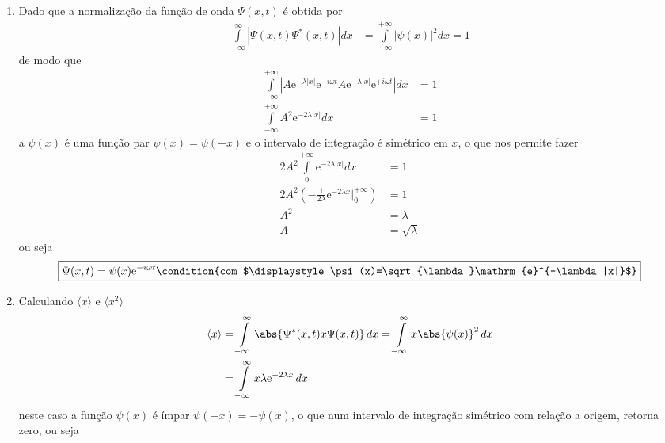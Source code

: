 \begin{prob}
	\begin{sol}
		\begin{enumerate}[label=\alph *)]
			\item Dado que a normalização da função de onda $\Psi (x,t)$ é obtida por  
				\begin{align}
					\int\limits_{-\infty}^{\infty}|\Psi (x,t)\Psi^{*} (x,t)|dx &= \int\limits_{-\infty}^{+\infty}|\psi (x)|^{2}dx = 1
				\end{align}
				de modo que
				\begin{align}
					\int\limits_{-\infty}^{+\infty}|A \mathrm{e}^{-\lambda |x|} \mathrm{e}^{-i \omega t}A \mathrm{e}^{-\lambda |x|} \mathrm{e}^{+i \omega t}|dx &=1 \nonumber\\
					\int\limits_{-\infty}^{+\infty}A^{2} \mathrm{e}^{-2 \lambda |x|}dx &= 1
				\end{align}
				a $\psi(x)$ é uma função par $\psi(x) = \psi(-x)$ e o intervalo de integração é simétrico em $x$, o que nos permite fazer
				\begin{align}
					2A^{2}	\int\limits_{0}^{+\infty} \mathrm{e}^{-2 \lambda |x|}dx &= 1\nonumber \\
					2A^{2}\left(-\frac{1}{2 \lambda} \mathrm{e}^{-2 \lambda x}\bigg|_{0}^{+\infty}\right) &= 1\nonumber \\
					A^{2} &= \lambda \nonumber \\
					A &= \sqrt{\lambda}
				\end{align}
				ou seja
				\begin{dmath*}
					\boxed{
						\Psi(x,t)=\psi(x)\mathrm{e}^{-i \omega t}\condition{com $\displaystyle \psi(x)=\sqrt{\lambda}\mathrm{e}^{-\lambda |x|}$}
					}
				\end{dmath*}
			\item Calculando $\langle x \rangle$ e $\langle x^{2} \rangle$
				\begin{align}
					\begin{split}
						\langle x \rangle &= \int\limits_{- \infty}^{\infty}\abs{\Psi^{*}(x,t)x \Psi(x,t)}\,d{x} = \int\limits_{- \infty}^{\infty}x \abs{\psi(x)}^{2}\,d{x}\\
															&= \int\limits_{- \infty}^{\infty}x \lambda \mathrm{e}^{-2 \lambda x}\,d{x}
					\end{split}
				\end{align}
				neste caso a função $\psi(x)$ é ímpar $\psi(-x)=-\psi(x)$, o que num intervalo de integração simétrico com relação a origem, retorna zero, ou seja
				\begin{align}

\end{align}
\end{enumerate}
\end{sol}
\end{prob}

